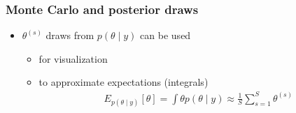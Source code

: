 \documentclass[10pt,handout]{beamer}
\begin{document}
\begin{frame}

\end{frame}

\begin{frame}

\frametitle{Monte Carlo and posterior draws}

  \begin{itemize}
  \item $\theta^{(s)}$ draws from $p(\theta \mid y)$ can be used
    \begin{itemize}
    \item<1-> for visualization
    \item<2-> to approximate expectations (integrals)
      \begin{align*}
        E_{p(\theta \mid y)}[\theta] = \int \theta p(\theta \mid y) \approx \frac{1}{S}\sum_{s=1}^{S} \theta^{(s)}
      \end{align*}
    \end{itemize}
  \end{itemize}

\end{frame}
\end{document}
